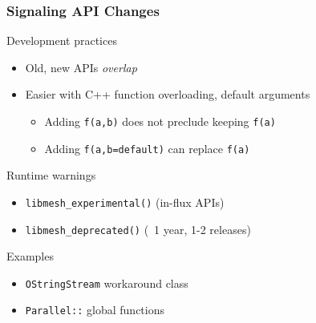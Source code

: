\documentclass[mathserif]{beamer}
\begin{document}
\begin{frame}
\frametitle{Signaling API Changes}
\begin{block}{Development practices}
\begin{itemize}
	\item Old, new APIs {\emph{overlap}}
	\item Easier with C++ function overloading, default arguments
	\begin{itemize}
		\item Adding \texttt{f(a,b)} does not preclude keeping
			\texttt{f(a)}
		\item Adding \texttt{f(a,b=default)} can replace
			\texttt{f(a)}
	\end{itemize}
\end{itemize}
\end{block}

\begin{block}{Runtime warnings}
\begin{itemize}
	\item {\texttt{libmesh\_experimental()}} \quad (in-flux APIs)
	\item {\texttt{libmesh\_deprecated()}} \quad (~1 year, 1-2 releases)
\end{itemize}
\end{block}

\begin{block}{Examples}
\begin{itemize}
	\item {\texttt{OStringStream} workaround class}
	\item {\texttt{Parallel::} global functions}
\end{itemize}
\end{block}


\end{frame}
\end{document}
